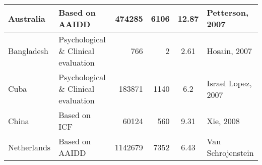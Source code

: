 \begin{spacing}{0.65}
\begin{longtable}{l p{1in} r r S l}
	Australia        & Based on AAIDD                       & 474285              & 6106               & 12.87                      & Petterson, 2007    \\* \midrule
	Bangladesh       & Psychological \& Clinical evaluation & 766                 & 2                  & 2.61                       & Hosain, 2007       \\* \midrule
	Cuba             & Psychological \& Clinical evaluation & 183871              & 1140               & 6.2                        & Israel Lopez, 2007 \\* \midrule
	China            & Based on ICF                         & 60124               & 560                & 9.31                       & Xie, 2008          \\* \midrule
	Netherlands      & Based on AAIDD                       & 1142679             & 7352               & 6.43                       & Van Schrojenstein  \\* \midrule
\end{longtable}
\end{spacing}
